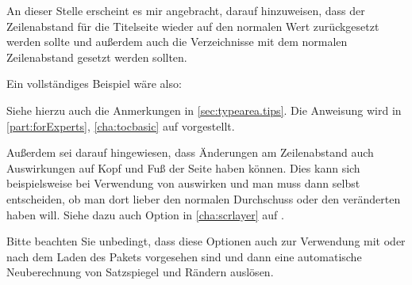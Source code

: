An dieser Stelle erscheint es mir angebracht, darauf
hinzuweisen, dass der Zeilenabstand für die Titelseite wieder auf den normalen
Wert zurückgesetzt werden sollte und außerdem auch die Verzeichnisse mit dem
normalen Zeilenabstand gesetzt werden sollten.
\begin{Example}
  Ein vollständiges Beispiel wäre also:
  Siehe hierzu auch die Anmerkungen in \autoref{sec:typearea.tips}. Die
  Anweisung  wird in
  \autoref{part:forExperts}, \autoref{cha:tocbasic} auf
   vorgestellt.
\end{Example}
Außerdem sei darauf hingewiesen, dass Änderungen am Zeilenabstand auch
Auswirkungen auf Kopf und Fuß der Seite haben können. Dies kann sich
beispielsweise bei Verwendung von  auswirken und man
muss dann selbst entscheiden, ob man dort lieber den normalen Durchschuss oder
den veränderten haben will. Siehe dazu auch Option
 in \autoref{cha:scrlayer}%
%
 auf
.

Bitte beachten Sie unbedingt, dass diese Optionen auch zur
Verwendung mit  oder
 nach dem Laden des Pakets vorgesehen sind
und dann eine automatische Neuberechnung
von Satzspiegel und Rändern auslösen.%
%
\EndIndexGroup
\EndIndexGroup


